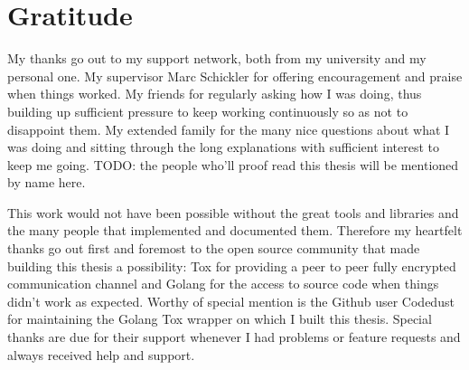 \section*{Gratitude}
\label{chap:gratitude}

My thanks go out to my support network, both from my university and my personal one.
My supervisor Marc Schickler for offering encouragement and praise when things worked.
My friends for regularly asking how I was doing, thus building up sufficient pressure to keep working continuously so as not to disappoint them.
My extended family for the many nice questions about what I was doing and sitting through the long explanations with sufficient interest to keep me going.
TODO: the people who'll proof read this thesis will be mentioned by name here.

This work would not have been possible without the great tools and libraries and the many people that implemented and documented them.
Therefore my heartfelt thanks go out first and foremost to the open source community that made building this thesis a possibility: Tox for providing a peer to peer fully encrypted communication channel and Golang for the access to source code when things didn't work as expected.
Worthy of special mention is the Github user Codedust for maintaining the Golang Tox wrapper on which I built this thesis.
Special thanks are due for their support whenever I had problems or feature requests and always received help and support.

